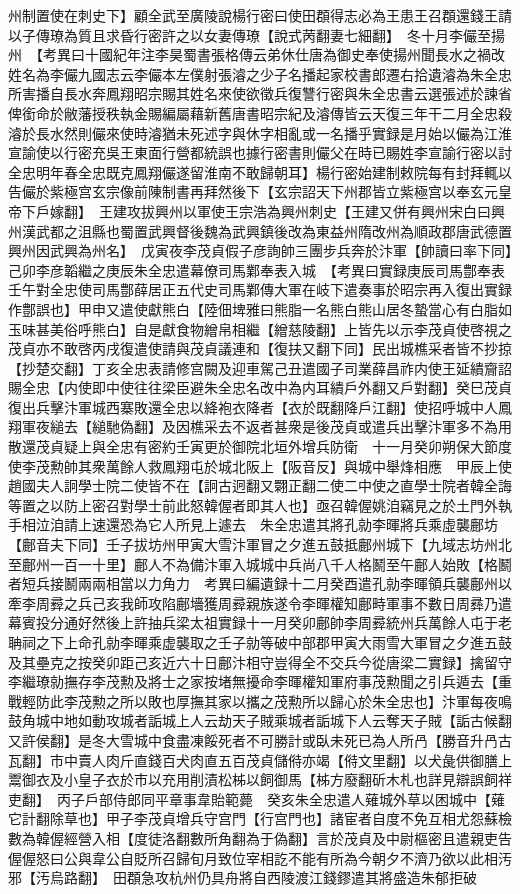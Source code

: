 州制置使在刺史下】顧全武至廣陵說楊行密曰使田頵得志必為王患王召頵還錢王請以子傳璙為質且求昏行密許之以女妻傳璙【說式苪翻妻七細翻】　冬十月李儼至揚州　【考異曰十國紀年注李昊蜀書張格傳云弟休仕唐為御史奉使揚州聞長水之禍改姓名為李儼九國志云李儼本左僕射張濬之少子名播起家校書郎遷右拾遺濬為朱全忠所害播自長水奔鳳翔昭宗賜其姓名來使欲徵兵復讐行密與朱全忠書云選張述於諫省俾銜命於敝藩授秩執金賜編屬藉新舊唐書昭宗紀及濬傳皆云天復三年干二月全忠殺濬於長水然則儼來使時濬猶未死述字與休字相亂或一名播乎實録是月始以儼為江淮宣諭使以行密充吳王東面行營都統誤也據行密書則儼父在時已賜姓李宣諭行密以討全忠明年春全忠既克鳳翔儼遂留淮南不敢歸朝耳】楊行密始建制敕院每有封拜輒以告儼於紫極宫玄宗像前陳制書再拜然後下【玄宗詔天下州郡皆立紫極宫以奉玄元皇帝下戶嫁翻】　王建攻拔興州以軍使王宗浩為興州刺史【王建又併有興州宋白曰興州漢武都之沮縣也蜀置武興督後魏為武興鎮後改為東益州隋改州為順政郡唐武德置興州因武興為州名】　戊寅夜李茂貞假子彦詢帥三團步兵奔於汴軍【帥讀曰率下同】己卯李彦韜繼之庚辰朱全忠遣幕僚司馬鄴奉表入城　【考異曰實録庚辰司馬鄷奉表壬午對全忠使司馬鄷薛居正五代史司馬鄴傳大軍在岐下遣奏事於昭宗再入復出實録作鄷誤也】甲申又遣使獻熊白【陸佃埤雅曰熊脂一名熊白熊山居冬蟄當心有白脂如玉味甚美俗呼熊白】自是獻食物繒帛相繼【繒慈陵翻】上皆先以示李茂貞使啓視之茂貞亦不敢啓丙戌復遣使請與茂貞議連和【復扶又翻下同】民出城樵采者皆不抄掠【抄楚交翻】丁亥全忠表請修宫闕及迎車駕己丑遣國子司業薛昌祚内使王延繢齎詔賜全忠【内使即中使往往梁臣避朱全忠名改中為内耳繢戶外翻又戶對翻】癸巳茂貞復出兵擊汴軍城西寨敗還全忠以絳袍衣降者【衣於既翻降戶江翻】使招呼城中人鳳翔軍夜縋去【縋馳偽翻】及因樵采去不返者甚衆是後茂貞或遣兵出擊汴軍多不為用散還茂貞疑上與全忠有密約壬寅更於御院北垣外增兵防衛　十一月癸卯朔保大節度使李茂勲帥其衆萬餘人救鳳翔屯於城北阪上【阪音反】與城中舉烽相應　甲辰上使趙國夫人詗學士院二使皆不在【詗古迥翻又翾正翻二使二中使之直學士院者韓全誨等置之以防上密召對學士前此怒韓偓者即其人也】亟召韓偓姚洎竊見之於土門外執手相泣洎請上速還恐為它人所見上遽去　朱全忠遣其將孔勍李暉將兵乘虛襲鄜坊【鄜音夫下同】壬子拔坊州甲寅大雪汴軍冒之夕進五鼓抵鄜州城下【九域志坊州北至鄜州一百一十里】鄜人不為備汴軍入城城中兵尚八千人格鬭至午鄜人始敗【格鬭者短兵接鬭兩兩相當以力角力　考異曰編遺録十二月癸酉遣孔勍李暉領兵襲鄜州以牽李周彛之兵己亥我師攻陷鄜墻獲周彛親族遂令李暉權知鄜畤軍事不數日周彞乃遣幕賓投分通好然後上許抽兵梁太祖實録十一月癸卯鄜帥李周彛統州兵萬餘人屯于老聃祠之下上命孔勍李暉乘虚襲取之壬子勍等破中部郡甲寅大雨雪大軍冒之夕進五鼓及其壘克之按癸卯距己亥近六十日鄜汴相守豈得全不交兵今從唐梁二實録】擒留守李繼璙勍撫存李茂勲及將士之家按堵無擾命李暉權知軍府事茂勲聞之引兵遁去【重戰輕防此李茂勲之所以敗也厚撫其家以攜之茂勲所以歸心於朱全忠也】汴軍每夜鳴鼓角城中地如動攻城者詬城上人云劫天子賊乘城者詬城下人云奪天子賊【詬古候翻又許侯翻】是冬大雪城中食盡凍餒死者不可勝計或臥未死已為人所冎【勝音升冎古瓦翻】市中賣人肉斤直錢百犬肉直五百茂貞儲偫亦竭【偫文里翻】以犬彘供御膳上鬻御衣及小皇子衣於市以充用削漬松柹以飼御馬【柹方廢翻斫木札也詳見辯誤飼祥吏翻】　丙子戶部侍郎同平章事韋貽範薨　癸亥朱全忠遣人薙城外草以困城中【薙它計翻除草也】甲子李茂貞增兵守宫門【行宫門也】諸宦者自度不免互相尤怨蘇檢數為韓偓經營入相【度徒洛翻數所角翻為于偽翻】言於茂貞及中尉樞密且遣親吏告偓偓怒曰公與韋公自貶所召歸旬月致位宰相訖不能有所為今朝夕不濟乃欲以此相汚邪【汚烏路翻】　田頵急攻杭州仍具舟將自西陵渡江錢鏐遣其將盛造朱郁拒破